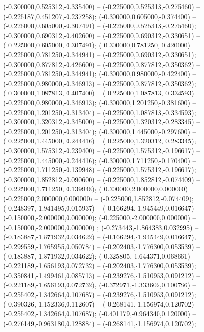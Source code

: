  (-0.300000,0.525312,-0.335400) -- (-0.225000,0.525313,-0.275460) -- (-0.225187,0.451207,-0.237258);
 (-0.300000,0.605000,-0.374400) -- (-0.225000,0.605000,-0.307491) -- (-0.225000,0.525313,-0.275460);
 (-0.300000,0.690312,-0.402600) -- (-0.225000,0.690312,-0.330651) -- (-0.225000,0.605000,-0.307491);
 (-0.300000,0.781250,-0.420000) -- (-0.225000,0.781250,-0.344941) -- (-0.225000,0.690312,-0.330651);
 (-0.300000,0.877812,-0.426600) -- (-0.225000,0.877812,-0.350362) -- (-0.225000,0.781250,-0.344941);
 (-0.300000,0.980000,-0.422400) -- (-0.225000,0.980000,-0.346913) -- (-0.225000,0.877812,-0.350362);
 (-0.300000,1.087813,-0.407400) -- (-0.225000,1.087813,-0.334593) -- (-0.225000,0.980000,-0.346913);
 (-0.300000,1.201250,-0.381600) -- (-0.225000,1.201250,-0.313404) -- (-0.225000,1.087813,-0.334593);
 (-0.300000,1.320312,-0.345000) -- (-0.225000,1.320312,-0.283345) -- (-0.225000,1.201250,-0.313404);
 (-0.300000,1.445000,-0.297600) -- (-0.225000,1.445000,-0.244416) -- (-0.225000,1.320312,-0.283345);
 (-0.300000,1.575312,-0.239400) -- (-0.225000,1.575312,-0.196617) -- (-0.225000,1.445000,-0.244416);
 (-0.300000,1.711250,-0.170400) -- (-0.225000,1.711250,-0.139948) -- (-0.225000,1.575312,-0.196617);
 (-0.300000,1.852812,-0.090600) -- (-0.225000,1.852812,-0.074409) -- (-0.225000,1.711250,-0.139948);
 (-0.300000,2.000000,0.000000) -- (-0.225000,2.000000,0.000000) -- (-0.225000,1.852812,-0.074409);
 (-0.248397,-1.941495,0.015937) -- (-0.166294,-1.945449,0.016647) -- (-0.150000,-2.000000,0.000000);
 (-0.225000,-2.000000,0.000000) -- (-0.150000,-2.000000,0.000000) ;
 (-0.273443,-1.864383,0.032995) -- (-0.183887,-1.871932,0.034622) -- (-0.166294,-1.945449,0.016647);
 (-0.299559,-1.765955,0.050784) -- (-0.202403,-1.776300,0.053539) -- (-0.183887,-1.871932,0.034622);
 (-0.325805,-1.644371,0.068661) -- (-0.221189,-1.656193,0.072732) -- (-0.202403,-1.776300,0.053539);
 (-0.350841,-1.499461,0.085713) -- (-0.239276,-1.510953,0.091212) -- (-0.221189,-1.656193,0.072732);
 (-0.372971,-1.333602,0.100786) -- (-0.255402,-1.342664,0.107687) -- (-0.239276,-1.510953,0.091212);
 (-0.390326,-1.152336,0.112607) -- (-0.268141,-1.156974,0.120702) -- (-0.255402,-1.342664,0.107687);
 (-0.401179,-0.964340,0.120000) -- (-0.276149,-0.963180,0.128884) -- (-0.268141,-1.156974,0.120702);
